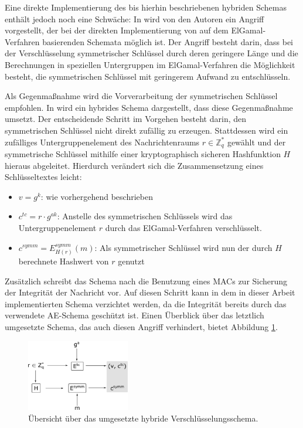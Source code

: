 Eine direkte Implementierung des bis hierhin beschriebenen hybriden Schemas enthält jedoch noch eine Schwäche: In \cite{boneh2000} wird von den Autoren ein Angriff vorgestellt, der bei der direkten Implementierung von auf dem ElGamal-Verfahren basierenden Schemata möglich ist. Der Angriff besteht darin, dass bei der Verschlüsselung symmetrischer Schlüssel durch deren geringere Länge und die Berechnungen in speziellen Untergruppen im ElGamal-Verfahren die Möglichkeit besteht, die symmetrischen Schlüssel mit geringerem Aufwand zu entschlüsseln.

Als Gegenmaßnahme wird die Vorverarbeitung der symmetrischen Schlüssel empfohlen. In \cite{abdalla1999} wird ein hybrides Schema dargestellt, dass diese Gegenmaßnahme umsetzt. Der entscheidende Schritt im Vorgehen besteht darin, den symmetrischen Schlüssel nicht direkt zufällig zu erzeugen. Stattdessen wird ein zufälliges Untergruppenelement des Nachrichtenraums \(r \in \mathbb{Z}_q^*\) gewählt und der symmetrische Schlüssel mithilfe einer kryptographisch sicheren Hashfunktion \(H\) hieraus abgeleitet. Hierdurch verändert sich die Zusammensetzung eines Schlüsseltextes leicht:

\begin{itemize}
  \item \(v = g^k\): wie vorhergehend beschrieben
  \item \(c^{tc} = r \cdot g^{ak}\): Anstelle des symmetrischen Schlüssels wird das Untergruppenelement \(r\) durch das ElGamal-Verfahren verschlüsselt.
  \item \(c^{symm} = E^{symm}_{H(r)}(m)\): Als symmetrischer Schlüssel wird nun der durch \(H\) berechnete Hashwert von \(r\) genutzt
\end{itemize}

Zusätzlich schreibt das Schema nach \cite{abdalla1999} die Benutzung eines MACs zur Sicherung der Integrität der Nachricht vor. Auf diesen Schritt kann in dem in dieser Arbeit implementierten Schema verzichtet werden, da die Integrität bereits durch das verwendete AE-Schema geschützt ist. Einen Überblick über das letztlich umgesetzte Schema, das auch diesen Angriff verhindert, bietet Abbildung \ref{fig:hybrid_scheme}.

\begin{figure}[]
    \centering
        \includegraphics[width=0.4\textwidth]{dia/hybrid_scheme.pdf}
    \caption{Übersicht über das umgesetzte hybride Verschlüsselungsschema.}
    \label{fig:hybrid_scheme}
\end{figure}

